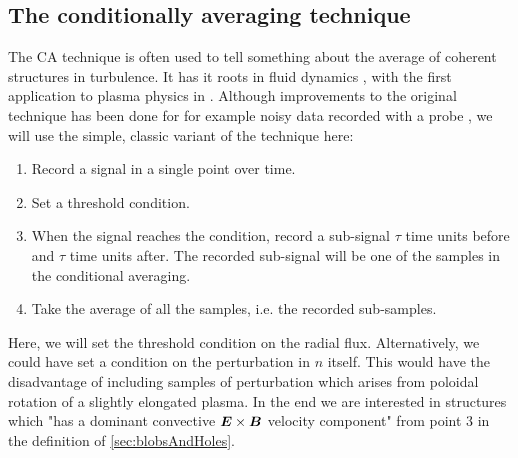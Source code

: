 \subsection{The conditionally averaging technique}
%
The CA technique is often used to tell something about the average of coherent structures in turbulence.
It has it roots in fluid dynamics \cite{Kovasznay1970}, with the first application to plasma physics in \cite{Huld1990}. Although improvements to the original technique has been done for for example noisy data recorded with a probe \cite{Teliban2007}, we will use the simple, classic variant of the technique here:
\newpage
%
\begin{algorithm}
\begin{enumerate}
    \item Record a signal in a single point over time.
    \item Set a threshold condition.
    \item When the signal reaches the condition, record a sub-signal $\tau$ time units before and $\tau$ time units after.
        The recorded sub-signal will be one of the samples in the conditional averaging.
    \item Take the average of all the samples, i.e. the recorded sub-samples.
\end{enumerate}
\end{algorithm}
%
Here, we will set the threshold condition on the radial flux.
Alternatively, we could have set a condition on the perturbation in $n$ itself.
This would have the disadvantage of including samples of perturbation which arises from poloidal rotation of a slightly elongated plasma.
In the end we are interested in structures which "has a dominant convective $\boldsymbol{E}\times\boldsymbol{B}$ velocity component" from point $3$ in the definition of \cref{sec:blobsAndHoles}.

